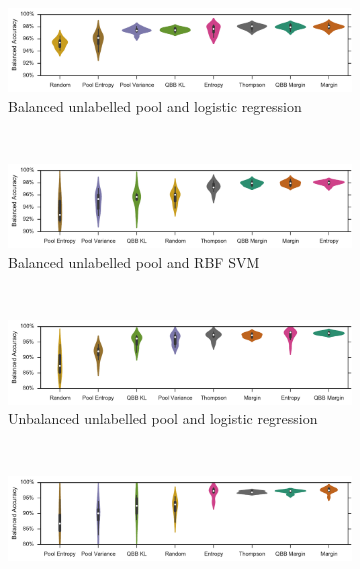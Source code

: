 \begin{figure}[p]
	\centering
	\begin{subfigure}{\textwidth}
		\centering
		\includegraphics[width=\textwidth]{figures/5_active/vstatlas_bl_ind_violin}
		\caption{Balanced unlabelled pool and logistic regression}
		\label{fig:vstatlas_bl_ind_violin}
	\end{subfigure}\\
	\begin{subfigure}{\textwidth}
		\centering
		\includegraphics[width=\linewidth]{figures/5_active/vstatlas_br_ind_violin}
		\caption{Balanced unlabelled pool and RBF SVM}
		\label{fig:vstatlas_br_ind_violin}
	\end{subfigure}\\
	\begin{subfigure}{\textwidth}
		\centering
		\includegraphics[width=\textwidth]{figures/5_active/vstatlas_ul_ind_violin}
		\caption{Unbalanced unlabelled pool and logistic regression}
		\label{fig:vstatlas_ul_ind_violin}
	\end{subfigure}\\
	\begin{subfigure}{\textwidth}
		\centering
		\includegraphics[width=\linewidth]{figures/5_active/vstatlas_ur_ind_violin}

\end{subfigure}
\end{figure}

